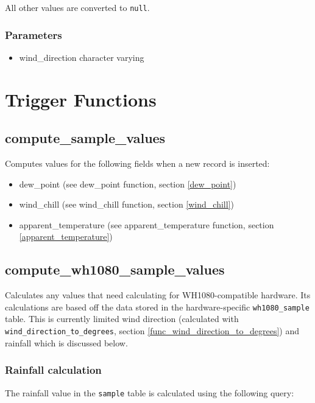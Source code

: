 \documentclass[a4paper,10pt]{book}
\begin{document}
All other values are converted to \verb|null|.

\subsubsection{Parameters}
\begin{itemize}
\item wind\_direction character varying
\end{itemize}

\section{Trigger Functions}
\label{trig_funcs}
\subsection{compute\_sample\_values}
\label{compute_sample_values}
Computes values for the following fields when a new record is inserted:
\begin{itemize}
\item dew\_point (see dew\_point function, section \ref{dew_point})
\item wind\_chill (see wind\_chill function, section \ref{wind_chill})
\item apparent\_temperature (see apparent\_temperature function, section \ref{apparent_temperature})
\end{itemize}

\subsection{compute\_wh1080\_sample\_values}
\label{compute_wh1080_sample_values}

Calculates any values that need calculating for WH1080-compatible hardware. Its calculations are based off the data stored in the hardware-specific \verb|wh1080_sample| table. This is currently limited wind direction (calculated with \verb|wind_direction_to_degrees|, section \ref{func_wind_direction_to_degrees}) and rainfall which is discussed below.

\subsubsection{Rainfall calculation}
The rainfall value in the \verb|sample| table is calculated using the following query:

\lstset{
  language=SQL,
  frame=single,
  numbers=left,
  basicstyle=\small,
  commentstyle=\emph
}
\end{document}
